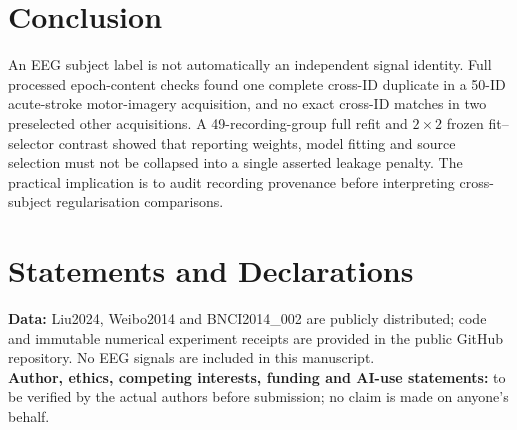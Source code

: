 \documentclass[11pt,a4paper]{article}
\begin{document}
\section{Conclusion}
An EEG subject label is not automatically an independent
signal identity. Full processed epoch-content checks found
one complete cross-ID duplicate in a 50-ID acute-stroke
motor-imagery acquisition, and no exact cross-ID matches
in two preselected other acquisitions. A 49-recording-group
full refit and $2\times2$ frozen fit--selector contrast
showed that reporting weights, model fitting and source
selection must not be collapsed into a single asserted
leakage penalty. The practical implication is to audit
recording provenance before interpreting cross-subject
regularisation comparisons.

\section*{Statements and Declarations}
\textbf{Data:} Liu2024, Weibo2014 and BNCI2014\_002
are publicly distributed; code and immutable numerical
experiment receipts are provided in the public GitHub
repository. No EEG signals are included in this manuscript.\\
\textbf{Author, ethics, competing interests,
funding and AI-use statements:} to be verified by
the actual authors before submission; no claim is made
on anyone's behalf.



\end{document}

